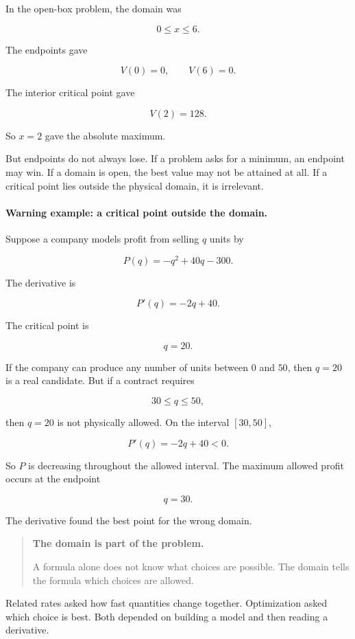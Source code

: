 In the open-box problem, the domain was

\[
0\le x\le 6.
\]

The endpoints gave

\[
V(0)=0,
\qquad
V(6)=0.
\]

The interior critical point gave

\[
V(2)=128.
\]

So \(x=2\) gave the absolute maximum.

But endpoints do not always lose.  If a problem asks for a minimum, an endpoint may win.
If a domain is open, the best value may not be attained at all.  If a critical point lies outside
the physical domain, it is irrelevant.

\paragraph{Warning example: a critical point outside the domain.}
Suppose a company models profit from selling \(q\) units by

\[
P(q)=-q^2+40q-300.
\]

The derivative is

\[
P'(q)=-2q+40.
\]

The critical point is

\[
q=20.
\]

If the company can produce any number of units between \(0\) and \(50\), then \(q=20\)
is a real candidate.  But if a contract requires

\[
30\le q\le 50,
\]

then \(q=20\) is not physically allowed.  On the interval \([30,50]\),

\[
P'(q)=-2q+40<0.
\]

So \(P\) is decreasing throughout the allowed interval.  The maximum allowed profit occurs
at the endpoint

\[
q=30.
\]

The derivative found the best point for the wrong domain.

\begin{quote}
\textbf{The domain is part of the problem.}

A formula alone does not know what choices are possible.  The domain tells the formula
which choices are allowed.
\end{quote}

Related rates asked how fast quantities change together.  Optimization asked which choice
is best.  Both depended on building a model and then reading a derivative.

